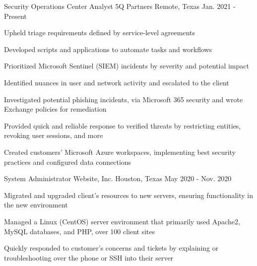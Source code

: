 \begin{cventries}
\cventry
  {Security Operations Center Analyst} %
  {5Q Partners} %
  {Remote, Texas} %
  {Jan. 2021 - Present} %
  {
    \begin{cvitems}
      \item {Upheld triage requirements defined by service-level agreements}
      \item {Developed scripts and applications to automate tasks and workflows}
      \item {Prioritized Microsoft Sentinel (SIEM) incidents by severity and potential impact}
      \item {Identified nuances in user and network activity and escalated to the client}
      \item {Investigated potential phishing incidents, via Microsoft 365 security and wrote Exchange policies for remediation}
      \item {Provided quick and reliable response to verified threats by restricting entities, revoking user sessions, and more}
      \item{Created customers' Microsoft Azure workspaces, implementing best security practices and configured data connections}
    \end{cvitems}
  }
\cventry
  {System Administrator} %
  {Website, Inc.} %
  {Houston, Texas} %
  {May 2020 - Nov. 2020} %
  {
    \begin{cvitems}
      \item{Migrated and upgraded client's resources to new servers, ensuring functionality in the new environment}
      \item {Managed a Linux (CentOS) server environment that primarily used Apache2, MySQL databases, and PHP, over 100 client sites}
      \item {Quickly responded to customer's concerns and tickets by explaining or troubleshooting over the phone or SSH into their server}
    \end{cvitems}
  }
  \end{cventries}
